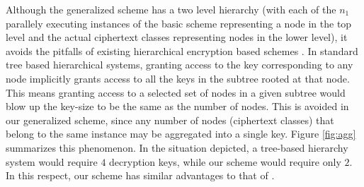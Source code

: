Although the generalized scheme has a two level hierarchy (with each of the $n_1$ parallely executing instances of the basic scheme representing a node in the top level and the actual ciphertext classes representing nodes in the lower level), it avoids the pitfalls of existing hierarchical encryption based schemes \cite{akl1983cryptographic,ateniese2012provably}. In standard tree based hierarchical systems, granting access to the key corresponding to any node implicitly grants access to all the keys in the subtree rooted at that node. This means granting access to a selected set of nodes in a given subtree would blow up the key-size to be the same as the number of nodes. This is avoided in our generalized scheme, since any number of nodes (ciphertext classes) that belong to the same instance may be aggregated into a single key. Figure \ref{fig:agg} summarizes this phenomenon. In the situation depicted, a tree-based hierarchy system would require $4$ decryption keys, while our 
scheme would require only $2$. In this respect, our scheme has similar advantages to that of \cite{chu2014key}.











